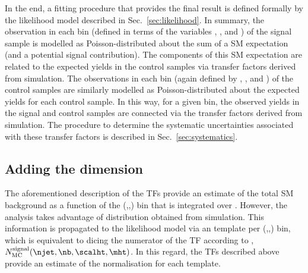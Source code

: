 In the end, a fitting procedure that provides the final result is
defined formally by the likelihood model described in
Sec.~\ref{sec:likelihood}. In summary, the observation in each bin
(defined in terms of the variables \njet, \nb, and \scalht) of the
signal sample is modelled as Poisson-distributed about the sum of a SM
expectation (and a potential signal contribution). The components of
this SM expectation are related to the expected yields in the control
samples via transfer factors derived from simulation. The observations
in each bin (again defined by \njet, \nb, and \scalht) of the control
samples are similarly modelled as Poisson-distributed about the
expected yields for each control sample. In this way, for a given
bin, the observed yields in the signal and control samples are
connected via the transfer factors derived from simulation. 
The procedure to determine the systematic uncertainties associated
with these transfer factors is described in
Sec.~\ref{sec:systematics}.





\subsection{Adding the \mht dimension}

The aforementioned description of the TFs provide an estimate of the
total SM background as a function of the (\njet,\nb,\HT) bin that is
integrated over \mht. However, the analysis takes advantage of \mht
distribution obtained from simulation. This information is propagated
to the likelihood model via an \mht template per (\njet,\nb,\HT) bin,
which is equivalent to dicing the numerator of the TF according to
\mht, \ie $N_{\rm MC}^{\rm signal}(\njet,\nb,\scalht,\mht)$. In this
regard, the TFs described above provide an estimate of the
normalisation for each \mht template.

